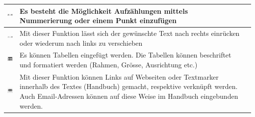 \begin{tabular}{c | p{14cm} l}
\hline
\includegraphics[height=12pt]{../chapters/09_Qualitaetsmanagement/pictures/Format/Aufzaehlung.jpg} & Es besteht die Möglichkeit Aufzählungen mittels Nummerierung oder einem Punkt einzufügen \\
\hline
\includegraphics[height=12pt]{../chapters/09_Qualitaetsmanagement/pictures/Format/Einruecken.jpg} & Mit dieser Funktion lässt sich der gewünschte Text nach rechts einrücken oder wiederum nach links zu verschieben \\
\hline
\includegraphics[height=12pt]{../chapters/09_Qualitaetsmanagement/pictures/Format/Tabellen.jpg} & Es können Tabellen eingefügt werden. Die Tabellen können beschriftet und formatiert werden (Rahmen, Grösse, Ausrichtung etc.) \\
\hline
\includegraphics[height=12pt]{../chapters/09_Qualitaetsmanagement/pictures/Format/Link.jpg} & Mit dieser Funktion können Links auf Webseiten oder Textmarker innerhalb des Textes (Handbuch) gemacht, respektive verknüpft werden. Auch Email-Adressen können auf diese Weise im Handbuch eingebunden werden. \\
\hline
\end{tabular}





